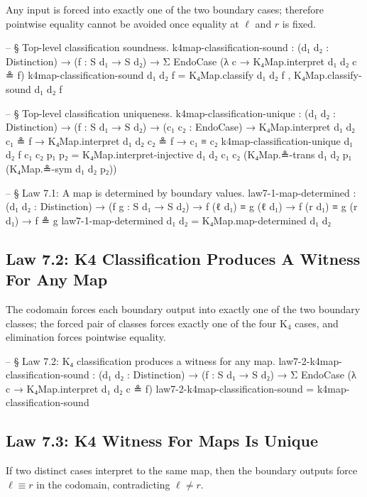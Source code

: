 \documentclass[11pt,a4paper]{book}
\def\texorpdfstring#1#2{#2}%
\begin{document}
Any input is forced into exactly one of the two boundary cases; therefore pointwise equality cannot be avoided once equality at $\ell$ and $r$ is fixed.

\begin{code}
-- § Top-level classification soundness.
k4map-classification-sound :
  (d₁ d₂ : Distinction) →
  (f : S d₁ → S d₂) →
  Σ EndoCase (λ c → K₄Map.interpret d₁ d₂ c ≗ f)
k4map-classification-sound d₁ d₂ f =
  K₄Map.classify d₁ d₂ f , K₄Map.classify-sound d₁ d₂ f

-- § Top-level classification uniqueness.
k4map-classification-unique :
  (d₁ d₂ : Distinction) →
  (f : S d₁ → S d₂) →
  (c₁ c₂ : EndoCase) →
  K₄Map.interpret d₁ d₂ c₁ ≗ f →
  K₄Map.interpret d₁ d₂ c₂ ≗ f →
  c₁ ≡ c₂
k4map-classification-unique d₁ d₂ f c₁ c₂ p₁ p₂ =
  K₄Map.interpret-injective d₁ d₂ c₁ c₂ (K₄Map.≗-trans d₁ d₂ p₁ (K₄Map.≗-sym d₁ d₂ p₂))

-- § Law 7.1: A map is determined by boundary values.
law7-1-map-determined :
  (d₁ d₂ : Distinction) →
  (f g : S d₁ → S d₂) →
  f (ℓ d₁) ≡ g (ℓ d₁) →
  f (r d₁) ≡ g (r d₁) →
  f ≗ g
law7-1-map-determined d₁ d₂ = K₄Map.map-determined d₁ d₂
\end{code}

\subsection{Law 7.2: K\texorpdfstring{$_4$}{4} Classification Produces A Witness For Any Map}

The codomain forces each boundary output into exactly one of the two boundary classes; the forced pair of classes forces exactly one of the four K$_4$ cases, and elimination forces pointwise equality.

\begin{code}
-- § Law 7.2: K₄ classification produces a witness for any map.
law7-2-k4map-classification-sound :
  (d₁ d₂ : Distinction) →
  (f : S d₁ → S d₂) →
  Σ EndoCase (λ c → K₄Map.interpret d₁ d₂ c ≗ f)
law7-2-k4map-classification-sound = k4map-classification-sound
\end{code}

\subsection{Law 7.3: K\texorpdfstring{$_4$}{4} Witness For Maps Is Unique}

If two distinct cases interpret to the same map, then the boundary outputs force $\ell \equiv r$ in the codomain, contradicting $\ell \neq r$.
\end{document}
